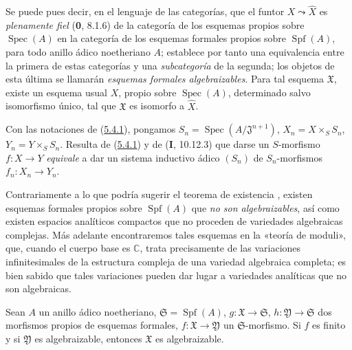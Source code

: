 Se puede pues decir, en el lenguaje de las categorías, que el funtor
$X\leadsto\widehat X$ es \emph{plenamente fiel} (\textbf{0}, 8.1.6) de la categoría de los
esquemas propios sobre $\operatorname{Spec}(A)$ en la categoría de los esquemas formales
propios sobre $\operatorname{Spf}(A)$, para todo anillo ádico noetheriano $A$;
establece por tanto una equivalencia entre la primera de estas categorías y una
\emph{subcategoría} de la segunda; los objetos de esta última se llamarán
\emph{esquemas formales algebraizables}. Para tal esquema $\mathfrak X$, existe
un esquema usual $X$, propio sobre $\operatorname{Spec}(A)$, determinado salvo isomorfismo
único, tal que $\mathfrak X$ es isomorfo a $\widehat X$.

\begin{scholium}[5.4.2]
\label{III.5.4.2-fr}
Con las notaciones de (\hyperref[III.5.4.1-fr]{5.4.1}), pongamos
$S_n=\operatorname{Spec}(A/\mathfrak J^{n+1})$,
$X_n=X\times_S S_n$, $Y_n=Y\times_S S_n$. Resulta de
(\hyperref[III.5.4.1-fr]{5.4.1}) y de (\textbf{I}, 10.12.3) que darse un
$S$-morfismo $f:X\to Y$ \emph{equivale} a dar un sistema inductivo
ádico $(S_n)$  de
$S_n$-morfismos $f_n:X_n\to Y_n$.
\end{scholium}

\begin{remark}[5.4.3]
\label{III.5.4.3}
\label{III.5.4.3-fr}
Contrariamente a lo que podría sugerir el teorema de existencia
, existen esquemas formales propios sobre $\operatorname{Spf}(A)$
que \emph{no son algebraizables}, así como existen espacios analíticos
compactos que no proceden de variedades algebraicas complejas. Más
adelante encontraremos tales esquemas en la «teoría de moduli»,
que, cuando el cuerpo base es $\mathbb C$, trata precisamente de las
variaciones infinitesimales de la estructura compleja de una variedad
algebraica completa; es bien sabido que tales variaciones pueden dar
lugar a variedades analíticas que no son algebraicas.
\end{remark}

\begin{proposition}[5.4.4]
\label{III.5.4.4-fr}
Sean $A$ un anillo ádico noetheriano, $\mathfrak S=\operatorname{Spf}(A)$,
$g:\mathfrak X\to\mathfrak S$, $h:\mathfrak Y\to\mathfrak S$ dos morfismos
propios de esquemas formales, $f:\mathfrak X\to\mathfrak Y$ un
$\mathfrak S$-morfismo. Si $f$ es finito y si $\mathfrak Y$ es algebraizable,
entonces $\mathfrak X$ es algebraizable.
\end{proposition}

